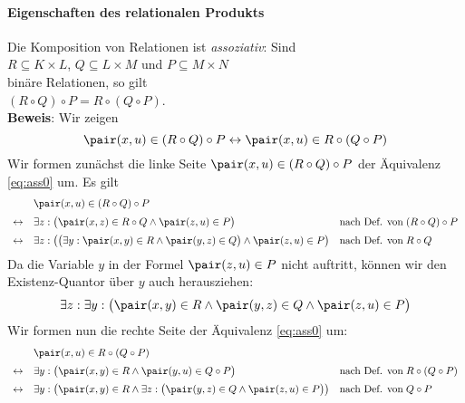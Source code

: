 \paragraph{Eigenschaften des relationalen Produkts}
Die Komposition von Relationen ist \emph{assoziativ}:  Sind \\[0.2cm]
\hspace*{1.3cm} $R \subseteq K \times L$, \quad $Q \subseteq L \times M$ \quad und \quad 
                $P \subseteq M \times N$ \\[0.2cm]
binäre Relationen, so gilt \\[0.2cm]
\hspace*{1.3cm} $(R \circ Q) \circ P = R \circ (Q \circ P)$. \\[0.2cm]
\textbf{Beweis}:  Wir zeigen
\begin{equation}
  \label{eq:ass0}
   \pair(x,u) \in (R \circ Q) \circ P \leftrightarrow \pair(x,u) \in R \circ (Q \circ P)   
\end{equation}
Wir formen zunächst die linke Seite $\pair(x,u) \in (R \circ Q) \circ P$ der Äquivalenz
\ref{eq:ass0} um.  Es gilt
\[
\begin{array}{cll}
                  & \pair(x,u) \in (R \circ Q) \circ P \\[0.2cm]
  \leftrightarrow & \exists z: \bigl(\pair(x,z) \in R \circ Q \wedge \pair(z,u) \in P\bigr) &
                    \mbox{nach Def. von}\; (R \circ Q) \circ P \\[0.2cm]
  \leftrightarrow & \exists z: \bigl(\bigl(\exists y: \pair(x,y) \in R \wedge \pair(y,z) \in Q\bigr) \wedge \pair(z,u) \in P\bigr) &
                    \mbox{nach Def. von}\; R \circ Q \\
\end{array}
\]
Da die Variable $y$ in der Formel $\pair(z,u) \in P$ nicht auftritt, können wir den
Existenz-Quantor über $y$ auch herausziehen:
\begin{equation}
  \label{eq:ass1}
  \exists z: \exists y: \bigl(\pair(x,y) \in R \wedge \pair(y,z) \in Q \wedge \pair(z,u) \in P\bigr)
\end{equation}
Wir formen nun die rechte Seite der Äquivalenz
\ref{eq:ass0} um:
\[
\begin{array}{cll}
                & \pair(x,u) \in R \circ (Q \circ P) \\[0.2cm] 
\leftrightarrow & \exists y: \bigl(\pair(x,y) \in R \wedge \pair (y,u) \in Q \circ P\bigr) &
                  \mbox{nach Def. von}\; R \circ (Q \circ P) \\[0.2cm]
\leftrightarrow & \exists y: \bigl(\pair(x,y) \in R \wedge 
                  \exists z: \bigl(\pair(y,z) \in Q \wedge \pair(z,u) \in P\bigr)\bigr) &
                  \mbox{nach Def. von}\; Q \circ P \\
\end{array}
\]

